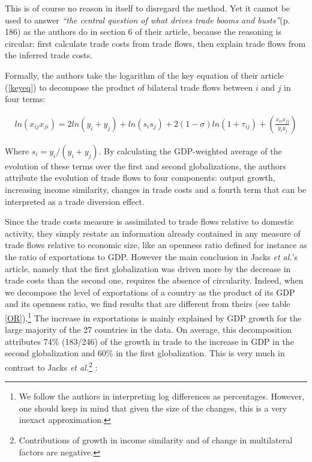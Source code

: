 \documentclass{article}
\begin{document}
This is of course no reason in itself to disregard the method.
Yet it cannot be used to answer \emph{``the central
question of what drives trade booms and busts''}(p. 186) as the
authors do in section 6 of their article, because the reasoning is
circular: first calculate trade costs from trade flows, then
explain trade flows from the inferred trade costs.

Formally, the authors take the logarithm of the key equation of
their article (\ref{keyeq}) to decompose the product of
bilateral trade flows between $i$ and $j$ in four terms:

\begin{eqnarray}
ln (x_{ij}x_{ji})= 2 ln(y_i + y_j)+ ln (s_i s_j) + 2(1-\sigma)ln(1+\tau_{ij})+ \left(\frac{x_{ii} x_{jj}}{y_i y_j}\right)
\end{eqnarray}

Where $s_i=y_i/(y_i+y_j)$. By calculating the GDP-weighted
average of the evolution of these terms over the first and
second globalizations, the authors attribute the evolution of
trade flows to four components: output growth, increasing
income similarity, changes in trade costs and a fourth term
that can be interpreted as a trade diversion effect.

Since the trade costs measure is assimilated to trade flows
relative to domestic activity, they simply restate
 an information already contained in any measure of
trade flows relative to economic size, like an openness ratio
defined for instance as the ratio of exportations to GDP.
However the main conclusion in Jacks \textit{et al.}'s article, namely
that the first globalization was driven more by the decrease in
trade costs than the second one, requires the absence of circularity.
Indeed, when we decompose the level of
exportations of a country as the product of its GDP and its
openness ratio, we find results that are different from theirs (see table \ref{OR}).\footnote{We follow
the authors in interpreting log differences as percentages. However, one should keep in mind that given the
size of the changes, this is a very inexact approximation.} The increase in exportations is mainly explained by GDP growth for the large majority of the 27 countries in the
data. On average, this decomposition attributes 74\% (183/246) of
the growth in trade to the increase in GDP in the second
globalization and 60\% in the first globalization. This is very much in contrast to 
Jacks \textit{et al.}\footnote{Contributions of growth in income
similarity and of change in multilateral factors are negative.} :
 
\end{document}
